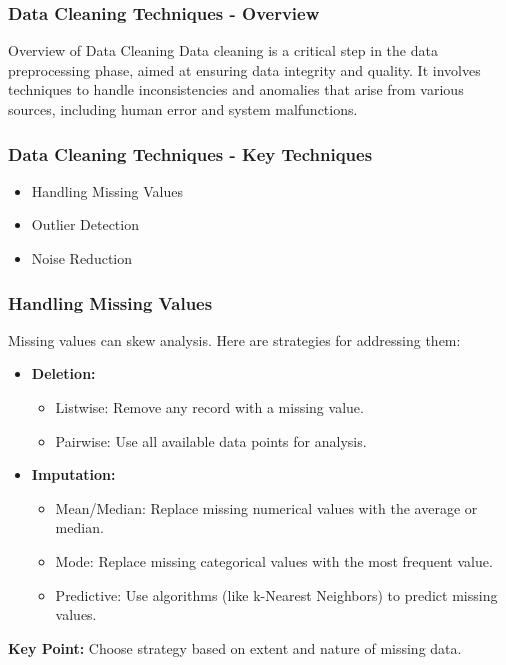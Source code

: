 \documentclass{beamer}
\begin{document}
\begin{frame}[fragile]
    \frametitle{Data Cleaning Techniques - Overview}
    \begin{block}{Overview of Data Cleaning}
        Data cleaning is a critical step in the data preprocessing phase, aimed at ensuring data integrity and quality. It involves techniques to handle inconsistencies and anomalies that arise from various sources, including human error and system malfunctions.
    \end{block}
\end{frame}

\begin{frame}[fragile]
    \frametitle{Data Cleaning Techniques - Key Techniques}
    \begin{itemize}
        \item Handling Missing Values
        \item Outlier Detection
        \item Noise Reduction
    \end{itemize}
\end{frame}

\begin{frame}[fragile]
    \frametitle{Handling Missing Values}
    Missing values can skew analysis. Here are strategies for addressing them:
    \begin{itemize}
        \item \textbf{Deletion:}
        \begin{itemize}
            \item Listwise: Remove any record with a missing value.
            \item Pairwise: Use all available data points for analysis.
        \end{itemize}
        \item \textbf{Imputation:}
        \begin{itemize}
            \item Mean/Median: Replace missing numerical values with the average or median.
            \item Mode: Replace missing categorical values with the most frequent value.
            \item Predictive: Use algorithms (like k-Nearest Neighbors) to predict missing values.
        \end{itemize}
    \end{itemize}
    \textbf{Key Point:} Choose strategy based on extent and nature of missing data.
\end{frame}
\end{document}
